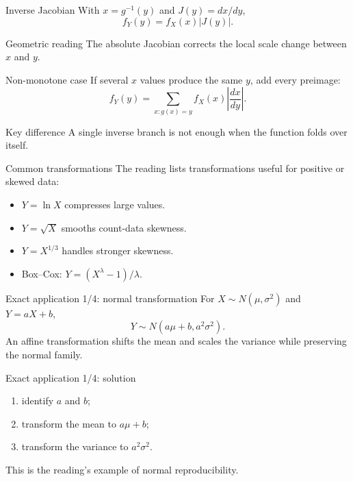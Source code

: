 \documentclass[10pt,aspectratio=169]{beamer}
\begin{document}
\begin{frame}{Inverse Jacobian}
  \footnotesize
  With $x=g^{-1}(y)$ and $J(y)=dx/dy$,
  \[
    f_Y(y)=f_X(x)|J(y)|.
  \]
  \begin{exampleblock}{Geometric reading}
    The absolute Jacobian corrects the local scale change between $x$ and $y$.
  \end{exampleblock}
\end{frame}

\begin{frame}{Non-monotone case}
  \footnotesize
  If several $x$ values produce the same $y$, add every preimage:
  \[
    f_Y(y)=\sum_{x:g(x)=y}f_X(x)\left|\frac{dx}{dy}\right|.
  \]
  \begin{alertblock}{Key difference}
    A single inverse branch is not enough when the function folds over itself.
  \end{alertblock}
\end{frame}

\begin{frame}{Common transformations}
  \footnotesize
  The reading lists transformations useful for positive or skewed data:
  \begin{itemize}\itemsep=0.11cm
    \item $Y=\ln X$ compresses large values.
    \item $Y=\sqrt X$ smooths count-data skewness.
    \item $Y=X^{1/3}$ handles stronger skewness.
    \item Box--Cox: $Y=(X^\lambda-1)/\lambda$.
  \end{itemize}
\end{frame}

\begin{frame}{Exact application 1/4: normal transformation}
  \footnotesize
  For $X\sim N(\mu,\sigma^2)$ and $Y=aX+b$,
  \[
    Y\sim N(a\mu+b,a^2\sigma^2).
  \]
  An affine transformation shifts the mean and scales the variance while
  preserving the normal family.
\end{frame}

\begin{frame}{Exact application 1/4: solution}
  \footnotesize
  \begin{enumerate}\itemsep=0.13cm
    \item identify $a$ and $b$;
    \item transform the mean to $a\mu+b$;
    \item transform the variance to $a^2\sigma^2$.
  \end{enumerate}
  This is the reading's example of normal reproducibility.
\end{frame}
\end{document}
